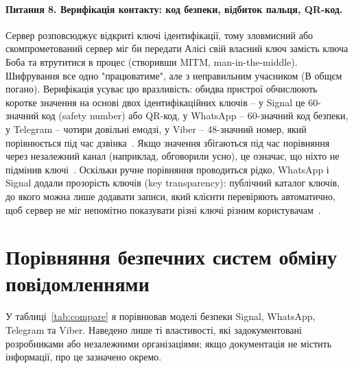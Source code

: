\paragraph{Питання 8. Верифікація контакту: код безпеки, відбиток пальця, QR-код.}
Сервер розповсюджує відкриті ключі ідентифікації, тому зловмисний або скомпрометований сервер міг би передати 
Алісі свій власний ключ замість ключа Боба та втрутитися в процес (створивши MITM, man-in-the-middle). Шифрування 
все одно "працюватиме"{}, але з неправильним учасником (В общєм погано). Верифікація усуває цю вразливість: 
обидва пристрої обчислюють коротке значення на основі двох ідентифікаційних ключів -- у Signal це 60-значний код (safety number) 
або QR-код, у WhatsApp -- 60-значний код безпеки, у Telegram -- чотири довільні емодзі, у Viber -- 48-значний 
номер, який порівнюється під час дзвінка~\cite{signal_safety_number, whatsapp_whitepaper, telegram_techfaq, viber_overview}. 
Якщо значення збігаються під час порівняння через незалежний канал (наприклад, обговорили усно), це означає, що 
ніхто не підмінив ключі~\cite{signal_x3dh}. Оскільки ручне порівняння проводиться рідко, WhatsApp і Signal додали 
прозорість ключів (key transparency): публічний каталог ключів, до якого можна лише додавати записи, який клієнти 
перевіряють автоматично, щоб сервер не міг непомітно показувати різні ключі різним користувачам~\cite{whatsapp_key_transparency, signal_akv}.

\section{Порівняння безпечних систем обміну повідомленнями}
\label{sec:comparison}

У таблиці~\ref{tab:compare} я порівнював моделі безпеки Signal, WhatsApp, Telegram та Viber. Наведено лише ті 
властивості, які задокументовані розробниками або незалежними організаціями; якщо документація не містить інформації, 
про це зазначено окремо.

